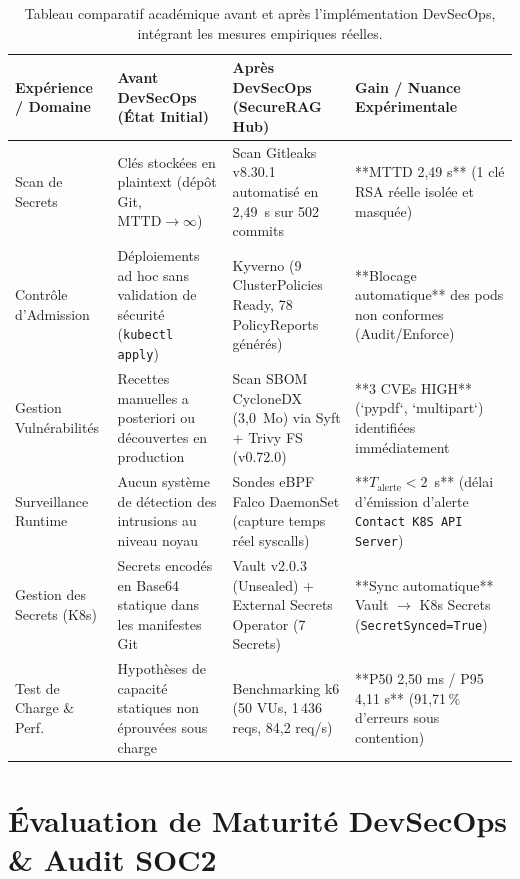 \begin{table}[H]
\centering
\scriptsize
\begin{tabular}{@{}p{2.8cm}p{4.2cm}p{4.8cm}p{2.2cm}@{}}
\toprule
\textbf{Expérience / Domaine} & \textbf{Avant DevSecOps (État Initial)} & \textbf{Après DevSecOps (SecureRAG Hub)} & \textbf{Gain / Nuance Expérimentale} \\
\midrule
Scan de Secrets & Clés stockées en plaintext (dépôt Git, $\text{MTTD} \rightarrow \infty$) & Scan Gitleaks v8.30.1 automatisé en 2,49~s sur 502 commits & **MTTD 2,49 s** (1 clé RSA réelle isolée et masquée) \\
Contrôle d'Admission & Déploiements ad hoc sans validation de sécurité (\texttt{kubectl apply}) & Kyverno (9 ClusterPolicies Ready, 78 PolicyReports générés) & **Blocage automatique** des pods non conformes (Audit/Enforce) \\
Gestion Vulnérabilités & Recettes manuelles a posteriori ou découvertes en production & Scan SBOM CycloneDX (3,0~Mo) via Syft + Trivy FS (v0.72.0) & **3 CVEs HIGH** (`pypdf`, `multipart`) identifiées immédiatement \\
Surveillance Runtime & Aucun système de détection des intrusions au niveau noyau & Sondes eBPF Falco DaemonSet (capture temps réel syscalls) & **$T_{\text{alerte}} < 2$~s** (délai d'émission d'alerte \texttt{Contact K8S API Server}) \\
Gestion des Secrets (K8s) & Secrets encodés en Base64 statique dans les manifestes Git & Vault v2.0.3 (Unsealed) + External Secrets Operator (7 Secrets) & **Sync automatique** Vault $\rightarrow$ K8s Secrets (\texttt{SecretSynced=True}) \\
Test de Charge \& Perf. & Hypothèses de capacité statiques non éprouvées sous charge & Benchmarking k6 (50 VUs, 1\,436 reqs, 84,2 req/s) & **P50 2,50 ms / P95 4,11 s** (91,71\,\% d'erreurs sous contention) \\
\bottomrule
\end{tabular}
\caption{Tableau comparatif académique avant et après l'implémentation DevSecOps, intégrant les mesures empiriques réelles.}
\label{tab:comparaison_avant_apres_full_sec}
\end{table}



\section{Évaluation de Maturité DevSecOps \& Audit SOC2}
\label{sec:modele_maturite}

